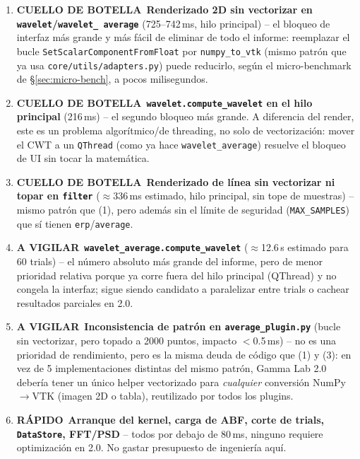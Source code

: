 \documentclass[11pt,a4paper]{article}
\newcommand{\okmark}{\textcolor{ok}{\textbf{RÁPIDO}}}
\newcommand{\warnmark}{\textcolor{advertencia}{\textbf{A VIGILAR}}}
\newcommand{\critmark}{\textcolor{critico}{\textbf{CUELLO DE BOTELLA}}}
\begin{document}
\begin{enumerate}
  \item \critmark\ \textbf{Renderizado 2D sin vectorizar en \texttt{wavelet}/\texttt{wavelet\_\allowbreak
        average}} (725--742\,ms, hilo principal) -- el bloqueo de interfaz más grande y más fácil de
        eliminar de todo el informe: reemplazar el bucle
        \texttt{SetScalarComponentFromFloat} por \texttt{numpy\_\allowbreak to\_\allowbreak vtk} (mismo
        patrón que ya usa \texttt{core/utils/adapters.py}) puede reducirlo, según el micro-benchmark de
        \S\ref{sec:micro-bench}, a pocos milisegundos.
  \item \critmark\ \textbf{\texttt{wavelet.compute\_\allowbreak wavelet} en el hilo principal} (216\,ms) --
        el segundo bloqueo más grande. A diferencia del render, este es un problema algorítmico/de
        threading, no solo de vectorización: mover el CWT a un \texttt{QThread} (como ya hace
        \texttt{wavelet\_\allowbreak average}) resuelve el bloqueo de UI sin tocar la matemática.
  \item \critmark\ \textbf{Renderizado de línea sin vectorizar ni topar en \texttt{filter}} ($\approx$336\,ms
        estimado, hilo principal, sin tope de muestras) -- mismo patrón que (1), pero además sin el límite
        de seguridad (\texttt{MAX\_\allowbreak SAMPLES}) que sí tienen \texttt{erp}/\texttt{average}.
  \item \warnmark\ \textbf{\texttt{wavelet\_\allowbreak average.compute\_\allowbreak wavelet}}
        ($\approx$12.6\,s estimado para 60 trials) -- el número absoluto más grande del informe, pero de
        menor prioridad relativa porque ya corre fuera del hilo principal (QThread) y no congela la
        interfaz; sigue siendo candidato a paralelizar entre trials o cachear resultados parciales en 2.0.
  \item \warnmark\ \textbf{Inconsistencia de patrón en \texttt{average\_\allowbreak plugin.py}} (bucle sin
        vectorizar, pero topado a 2000 puntos, impacto $<$0.5\,ms) -- no es una prioridad de rendimiento, pero
        es la misma deuda de código que (1) y (3): en vez de 5 implementaciones distintas del mismo patrón,
        Gamma Lab 2.0 debería tener un único helper vectorizado para \emph{cualquier} conversión NumPy$\to$VTK
        (imagen 2D o tabla), reutilizado por todos los plugins.
  \item \okmark\ \textbf{Arranque del kernel, carga de ABF, corte de trials, \texttt{DataStore}, FFT/PSD} --
        todos por debajo de 80\,ms, ninguno requiere optimización en 2.0. No gastar presupuesto de ingeniería
        aquí.
\end{enumerate}
\end{document}
